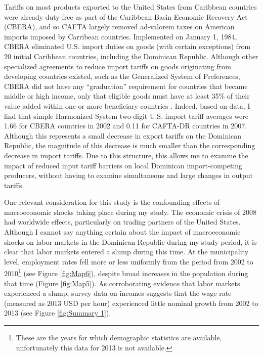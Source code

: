Tariffs on most products exported to the United States from Caribbean countries were 
already duty-free as part of the Caribbean Basin Economic Recovery Act (CBERA), and so CAFTA largely 
removed ad-valorem taxes on American imports imposed by Carribean countries. 
Implemented on January 1, 1984, CBERA eliminated U.S. import duties on goods (with certain
exceptions) from 20 initial Caribbean countries, including the Dominican Republic.
Although other specialized agreements to reduce import tariffs on goods originating from developing 
countries existed, such as the Generalized System of Preferences, CBERA did not have any ``graduation''
requirement for countries that became middle or high income, only that eligible  
goods must have at least 35\% of their value added within one or more beneficiary countries 
\citep{pelzman}. Indeed, based on \citeauthor{wtotariff} data, I find that simple Harmonized
System two-digit U.S. import tariff averages were 1.66 for CBERA countries in 2002 and 0.11 for 
CAFTA-DR countries in 2007. Although this represents a small decrease in export tariffs on
the Dominican Republic, the magnitude of this decrease is much smaller than the corresponding
decrease in import tariffs. Due to this structure, this allows me to examine the impact of reduced 
input tariff barriers on local Dominican import-competing producers, without having to 
examine simultaneous and large changes in output tariffs.

One relevant consideration for this study is the confounding effects of macroeconomic shocks 
taking place during my study. The economic crisis of 2008 had worldwide effects, particularly
on trading partners of the United States. Although I cannot say anything certain about the impact
of macroeconomic shocks on labor markets in the Dominican Republic during my study period, 
it is clear that labor markets entered a slump during this time. At the municipality level, employment
rates fell more or less uniformly from the period from 2002 to 2010\footnote{These are the years for
which demographic statistics are available, unfortunately this data for 2013 is not available.} (see
Figure \ref{fig:Map6}), despite broad increases in the population during that time (Figure \ref{fig:Map5}).
As corroborating evidence that labor markets experienced a slump, survey data on incomes suggests
that the wage rate (measured as 2013 USD per hour) experienced little nominal growth from 
2002 to 2013 (see Figure \ref{fig:Summary 1}).
